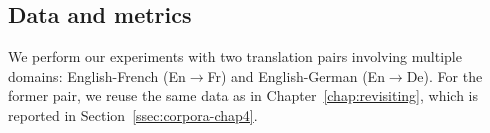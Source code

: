 \subsection{Data and metrics \label{ssec:corpora-chap6}}
We perform our experiments with two translation pairs involving multiple domains: English-French (En$\rightarrow$Fr) and English-German (En$\rightarrow$De). For the former pair, we reuse the same data as in Chapter~\ref{chap:revisiting}, which is reported in Section~\ref{ssec:corpora-chap4}.
%

